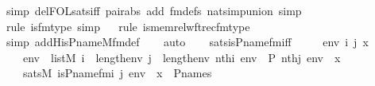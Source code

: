 \begin{isabellebody}
{\isacharparenleft}{\kern0pt}simp\ del{\isacharcolon}{\kern0pt}FOL{\isacharunderscore}{\kern0pt}sats{\isacharunderscore}{\kern0pt}iff\ pair{\isacharunderscore}{\kern0pt}abs\ add{\isacharcolon}{\kern0pt}\ fm{\isacharunderscore}{\kern0pt}defs\ nat{\isacharunderscore}{\kern0pt}simp{\isacharunderscore}{\kern0pt}union{\isacharcomma}{\kern0pt}\ simp{\isacharparenright}{\kern0pt}\isanewline
\ \ \ \isamarkupfalse%
{\isacharparenleft}{\kern0pt}rule\ is{\isacharunderscore}{\kern0pt}{}{\isacharunderscore}{\kern0pt}fm{\isacharunderscore}{\kern0pt}type{\isacharcomma}{\kern0pt}\ simp{\isacharparenright}{\kern0pt}\isanewline
\ \ \isamarkupfalse%
{\isacharparenleft}{\kern0pt}rule\ is{\isacharunderscore}{\kern0pt}memrel{\isacharunderscore}{\kern0pt}wftrec{\isacharunderscore}{\kern0pt}fm{\isacharunderscore}{\kern0pt}type{\isacharparenright}{\kern0pt}\isanewline
\ \ \ \ \ \isamarkupfalse%
{\isacharparenleft}{\kern0pt}simp\ add{\isacharcolon}{\kern0pt}His{\isacharunderscore}{\kern0pt}P{\isacharunderscore}{\kern0pt}name{\isacharunderscore}{\kern0pt}M{\isacharunderscore}{\kern0pt}fm{\isacharunderscore}{\kern0pt}def{\isacharparenright}{\kern0pt}\isanewline
\ \ \isamarkupfalse%
\ auto%
\endisatagproof
{\isafoldproof}%
%
\isadelimproof
\ \ \isanewline
%
\endisadelimproof
\isanewline
{}\isamarkupfalse%
\ sats{\isacharunderscore}{\kern0pt}is{\isacharunderscore}{\kern0pt}P{\isacharunderscore}{\kern0pt}name{\isacharunderscore}{\kern0pt}fm{\isacharunderscore}{\kern0pt}iff\ {\isacharcolon}{\kern0pt}\ \isanewline
\ \ \ env\ i\ j\ x\ \isanewline
\ \ \ {\isachardoublequoteopen}env\ {\isasymin}\ list{\isacharparenleft}{\kern0pt}M{\isacharparenright}{\kern0pt}{\isachardoublequoteclose}\ {\isachardoublequoteopen}i\ {\isacharless}{\kern0pt}\ length{\isacharparenleft}{\kern0pt}env{\isacharparenright}{\kern0pt}{\isachardoublequoteclose}\ {\isachardoublequoteopen}j\ {\isacharless}{\kern0pt}\ length{\isacharparenleft}{\kern0pt}env{\isacharparenright}{\kern0pt}{\isachardoublequoteclose}\ {\isachardoublequoteopen}nth{\isacharparenleft}{\kern0pt}i{\isacharcomma}{\kern0pt}\ env{\isacharparenright}{\kern0pt}\ {\isacharequal}{\kern0pt}\ P{\isachardoublequoteclose}\ {\isachardoublequoteopen}nth{\isacharparenleft}{\kern0pt}j{\isacharcomma}{\kern0pt}\ env{\isacharparenright}{\kern0pt}\ {\isacharequal}{\kern0pt}\ x{\isachardoublequoteclose}\ \ \isanewline
\ \ \ {\isachardoublequoteopen}sats{\isacharparenleft}{\kern0pt}M{\isacharcomma}{\kern0pt}\ is{\isacharunderscore}{\kern0pt}P{\isacharunderscore}{\kern0pt}name{\isacharunderscore}{\kern0pt}fm{\isacharparenleft}{\kern0pt}i{\isacharcomma}{\kern0pt}\ j{\isacharparenright}{\kern0pt}{\isacharcomma}{\kern0pt}\ env{\isacharparenright}{\kern0pt}\ {\isasymlongleftrightarrow}\ x\ {\isasymin}\ P{\isacharunderscore}{\kern0pt}names{\isachardoublequoteclose}\ \isanewline

\end{isabellebody}
